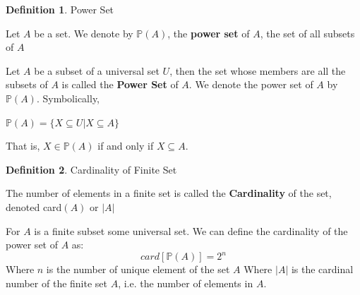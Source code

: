 \documentclass{book}
\theoremstyle{definition}
\newtheorem{definition}{Definition}[section]
\theoremstyle{remark}
\newcommand{\bb}[1]{\mathbb{#1}}
\begin{document}
    
\begin{definition}
Power Set \\
    
    \begin{tcolorbox}
    Let $A$ be a set. We denote by $\mathbb{P}(A)$, the \textbf{power set} of $A$, the set of all subsets of $A$
    
    Let $A$ be a subset of a universal set $U$, then the set whose members are all the subsets of $A$ is called the \textbf{Power Set} of $A$. We denote the power set of $A$ by $\bb{P}(A)$. Symbolically,
        \begin{center}
            $\mathbb{P}(A) = \{ X \subseteq U | X \subseteq A \}$ 
        \end{center}
    That is, $X \in \bb{P}(A)$ if and only if $X \subseteq A$. 
    \end{tcolorbox}

\end{definition}


\begin{definition}
Cardinality of Finite Set \\

    \begin{tcolorbox}
        The number of elements in a finite set is called the \textbf{Cardinality} of the set, denoted card$(A)$ or $|A|$
    \end{tcolorbox}
    For $A$ is a finite subset some universal set. We can define the cardinality of the power set of $A$ as: 
        \begin{equation*}
            card[\bb{P}(A)] = 2^n
        \end{equation*}
        Where $n$ is the number of unique element of the set $A$
    Where $|A|$ is the cardinal number of the finite set $A$, i.e. the number of elements in $A$.
\end{definition}
\end{document}
